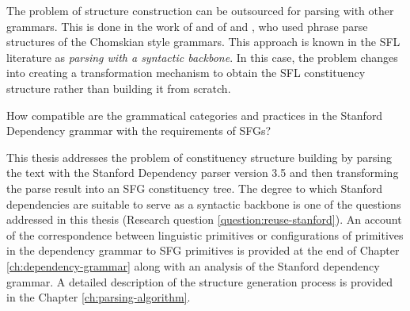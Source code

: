     
    The problem of structure construction can be outsourced for parsing with other grammars. This is done in the work of \citet{Kasper1988} and of \citet{Honnibal2004a} and \citet{Honnibal2007}, who used phrase parse structures of the Chomskian style grammars. This approach is known in the SFL literature as \textit{parsing with a syntactic backbone}. In this case, the problem changes into creating a transformation mechanism to obtain the SFL constituency structure rather than building it from scratch. 
    

    \begin{question}\label{question:reuse-stanford}
        How compatible are the grammatical categories and practices in the Stanford Dependency grammar with the requirements of SFGs?
    \end{question}

    This thesis addresses the problem of constituency structure building by parsing the text with the Stanford Dependency parser version 3.5 \citep{Marneffe2008a,Marneffe2008, Marneffe2014} and then transforming the parse result into an SFG constituency tree. The degree to which Stanford dependencies are suitable to serve as a syntactic backbone is one of the questions addressed in this thesis (Research question \ref{question:reuse-stanford}). %
    An account of the correspondence between linguistic primitives or configurations of primitives in the dependency grammar to SFG primitives is provided at the end of Chapter \ref{ch:dependency-grammar} along with an analysis of the Stanford dependency grammar. A detailed description of the structure generation process is provided in the Chapter \ref{ch:parsing-algorithm}.


